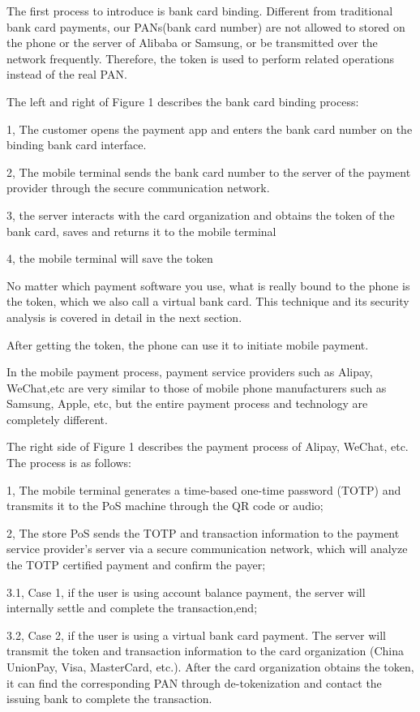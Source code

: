 \documentclass[journal]{IEEEtran}
\begin{document}
The first process to introduce is bank card binding. Different from traditional bank card payments, our PANs(bank card number) are not allowed to stored on the phone or the server of  Alibaba or Samsung, or be transmitted over the network frequently. Therefore, the token is used to perform related operations instead of the real PAN.

The left and right of Figure 1 describes the bank card binding process:

1, The customer opens the payment app and enters the bank card number on the binding bank card interface.

2, The mobile terminal sends the bank card number to the server of the payment provider through the secure communication network.

3, the server interacts with the card organization and obtains the token of the bank card, saves and returns it to the mobile terminal

4, the mobile terminal will save the token



No matter which payment software you use, what is really bound to the phone is the token, which we also call a virtual bank card. This technique and its security analysis is covered in detail in the next section.

After getting the token, the phone can use it to initiate mobile payment. 

In the mobile payment process, payment service providers such as Alipay, WeChat,etc are very similar to those of mobile phone manufacturers such as Samsung, Apple, etc, but the entire payment process and technology are completely different.

The right side of Figure 1 describes the payment process of Alipay, WeChat,  etc. The process is as follows:

1, The mobile terminal generates a time-based one-time password (TOTP) and transmits it to the PoS machine through the QR code or audio;

2, The store PoS sends the TOTP and transaction information to the payment service provider's server via a secure communication network, which will analyze the TOTP certified payment and confirm the payer;

3.1, Case 1, if the user is using account balance payment, the server will internally settle and complete the transaction,end;

3.2, Case 2, if the user is using a virtual bank card payment. The server will transmit the token and transaction information to the card organization (China UnionPay, Visa, MasterCard, etc.). After the card organization obtains the token, it can find the corresponding PAN through de-tokenization and contact the issuing bank to complete the transaction.
\end{document}
